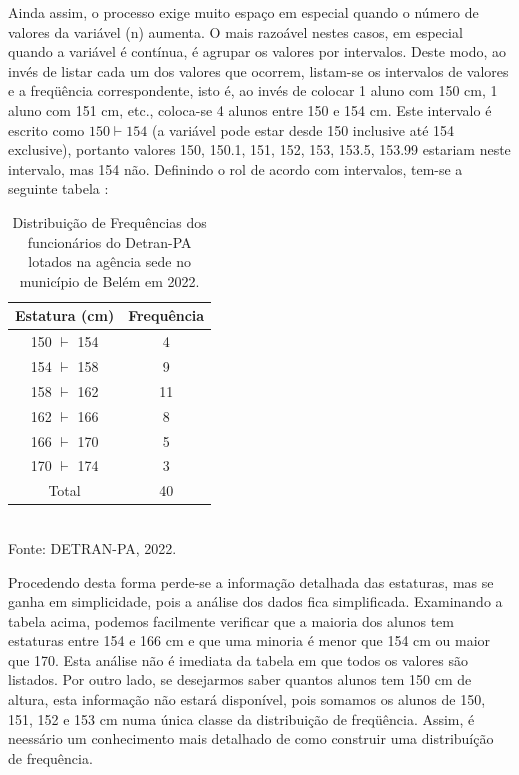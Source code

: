 \newpage 

Ainda assim, o processo exige muito espaço em especial quando o
número de valores da variável (n) aumenta. O mais razoável nestes
casos, em especial quando a variável é contínua, é agrupar os
valores por intervalos. Deste modo, ao invés de listar cada um dos
valores que ocorrem, listam-se os intervalos de valores e a
freqüência correspondente, isto é, ao invés de colocar 1 aluno com
150 cm, 1 aluno com 151 cm, etc., coloca-se 4 alunos entre 150 e
154 cm. Este intervalo é escrito como $150 \vdash 154$ (a variável
pode estar desde 150 inclusive até 154 exclusive), portanto
valores 150, 150.1, 151, 152, 153, 153.5, 153.99 estariam neste
intervalo, mas 154 não. Definindo o rol de acordo com intervalos,
tem-se a seguinte tabela :


\newpage

\begin{table}[!htb]
    \centering
    {
    \caption{Distribuição de Frequências dos funcionários do Detran-PA lotados na agência sede no município de Belém em 2022.}
    \label{estatura2}
    \vspace{0.2cm}
\begin{tabular}{c|c}
\hline\hline
Estatura (cm) & Frequência \\
  \hline\hline
  150 $\vdash$ 154 & 4  \\
  154 $\vdash$ 158 & 9 \\
  158 $\vdash$ 162 & 11  \\
  162 $\vdash$ 166 & 8  \\
  166 $\vdash$ 170 & 5  \\
  170 $\vdash$ 174 & 3  \\
  \hline\hline
  Total            & 40  \\
  \hline\hline
\end{tabular}}
\\
\hspace{-0.5cm}
Fonte: DETRAN-PA, 2022.
\end{table}



Procedendo desta forma perde-se a informação detalhada das
estaturas, mas se ganha em simplicidade, pois a análise dos dados
fica simplificada. Examinando a tabela acima, podemos facilmente
verificar que a maioria dos alunos tem estaturas entre 154 e 166
cm e que uma minoria é menor que 154 cm ou maior que 170. Esta
análise não é imediata da tabela em que todos os valores são
listados. Por outro lado, se desejarmos saber quantos alunos tem
150 cm de altura, esta informação não estará disponível, pois
somamos os alunos de 150, 151, 152 e 153 cm numa única classe da distribuição de freqüência. Assim, é neessário um conhecimento mais detalhado de como construir uma distribuíção de frequência.


